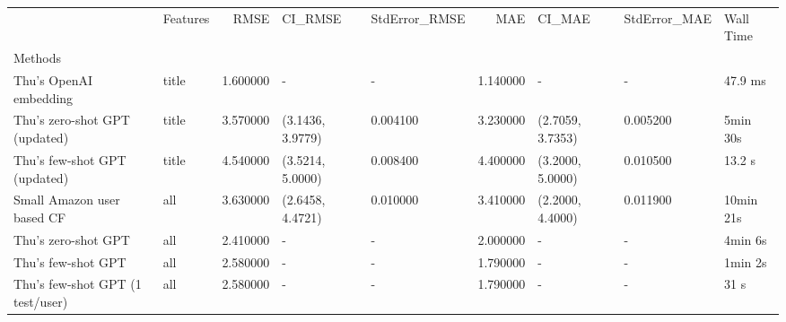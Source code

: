 \begin{tabular}{llrllrlll}
 & Features & RMSE & CI_RMSE & StdError_RMSE & MAE & CI_MAE & StdError_MAE & Wall Time \\
Methods &  &  &  &  &  &  &  &  \\
Thu's OpenAI embedding & title & 1.600000 & - & - & 1.140000 & - & - & 47.9 ms \\
Thu's zero-shot GPT (updated) & title & 3.570000 & (3.1436, 3.9779) & 0.004100 & 3.230000 & (2.7059, 3.7353) & 0.005200 & 5min 30s \\
Thu's few-shot GPT (updated) & title & 4.540000 & (3.5214, 5.0000) & 0.008400 & 4.400000 & (3.2000, 5.0000) & 0.010500 & 13.2 s \\
Small Amazon user based CF & all & 3.630000 & (2.6458, 4.4721) & 0.010000 & 3.410000 & (2.2000, 4.4000) & 0.011900 & 10min 21s \\
Thu's zero-shot GPT & all & 2.410000 & - & - & 2.000000 & - & - & 4min 6s \\
Thu's few-shot GPT & all & 2.580000 & - & - & 1.790000 & - & - & 1min 2s \\
Thu's few-shot GPT (1 test/user) & all & 2.580000 & - & - & 1.790000 & - & - & 31 s \\
\end{tabular}
